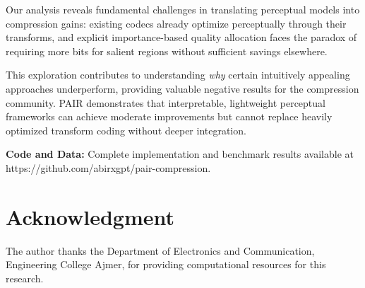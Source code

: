 \documentclass[conference]{IEEEtran}
\begin{document}
Our analysis reveals fundamental challenges in translating perceptual models into compression gains: existing codecs already optimize perceptually through their transforms, and explicit importance-based quality allocation faces the paradox of requiring more bits for salient regions without sufficient savings elsewhere.

This exploration contributes to understanding \textit{why} certain intuitively appealing approaches underperform, providing valuable negative results for the compression community. PAIR demonstrates that interpretable, lightweight perceptual frameworks can achieve moderate improvements but cannot replace heavily optimized transform coding without deeper integration.

\textbf{Code and Data:} Complete implementation and benchmark results available at https://github.com/abirxgpt/pair-compression.

\section*{Acknowledgment}
The author thanks the Department of Electronics and Communication, Engineering College Ajmer, for providing computational resources for this research.
\end{document}
